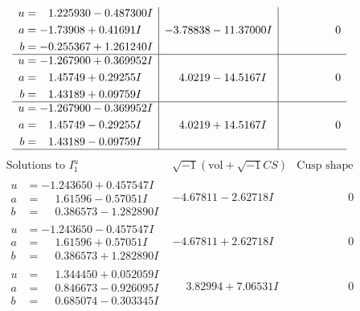 \documentclass[1p]{elsarticle_modified}
\theoremstyle{definition}
\newcommand{\I}{\sqrt{-1}}
\begin{document}
$$\begin{array}{c|c|c}
\begin{aligned}
u &= \phantom{-}1.225930 - 0.487300 I \\
a &= -1.73908 + 0.41691 I \\
b &= -0.255367 + 1.261240 I\end{aligned}
 & -3.78838 - 11.37000 I & \phantom{-0.000000 } 0 \\ \hline\begin{aligned}
u &= -1.267900 + 0.369952 I \\
a &= \phantom{-}1.45749 + 0.29255 I \\
b &= \phantom{-}1.43189 + 0.09759 I\end{aligned}
 & \phantom{-}4.0219 - 14.5167 I & \phantom{-0.000000 } 0 \\ \hline\begin{aligned}
u &= -1.267900 - 0.369952 I \\
a &= \phantom{-}1.45749 - 0.29255 I \\
b &= \phantom{-}1.43189 - 0.09759 I\end{aligned}
 & \phantom{-}4.0219 + 14.5167 I & \phantom{-0.000000 } 0\\
 \hline 
 \end{array}$$\newpage$$\begin{array}{c|c|c}  
\text{Solutions to }I^u_{1}& \I (\text{vol} + \sqrt{-1}CS) & \text{Cusp shape}\\
 \hline 
\begin{aligned}
u &= -1.243650 + 0.457547 I \\
a &= \phantom{-}1.61596 - 0.57051 I \\
b &= \phantom{-}0.386573 - 1.282890 I\end{aligned}
 & -4.67811 - 2.62718 I & \phantom{-0.000000 } 0 \\ \hline\begin{aligned}
u &= -1.243650 - 0.457547 I \\
a &= \phantom{-}1.61596 + 0.57051 I \\
b &= \phantom{-}0.386573 + 1.282890 I\end{aligned}
 & -4.67811 + 2.62718 I & \phantom{-0.000000 } 0 \\ \hline\begin{aligned}
u &= \phantom{-}1.344450 + 0.052059 I \\
a &= \phantom{-}0.846673 - 0.926095 I \\
b &= \phantom{-}0.685074 - 0.303345 I\end{aligned}
 & \phantom{-}3.82994 + 7.06531 I & \phantom{-0.000000 } 0 \\ \hline\begin{aligned}

\end{aligned}
\end{array}$$
\end{document}
